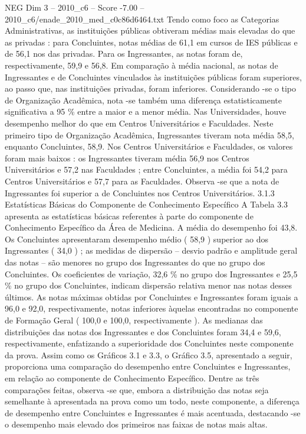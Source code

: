 \begin{textsample}{NEG Dim 3 – 2010\_c6 – Score -7.00 – 2010\_c6/enade\_2010\_med\_c0c86d6464.txt}
Tendo como foco as Categorias Administrativas, as instituições públicas obtiveram médias mais elevadas do que as privadas : para Concluintes, notas médias de 61,1 em cursos de IES públicas e de 56,1 nos das privadas.
Para os Ingressantes, as notas foram de, respectivamente, 59,9 e 56,8.
Em comparação à média nacional, as notas de Ingressantes e de Concluintes vinculados às instituições públicas foram superiores, ao passo que, nas instituições privadas, foram inferiores.
Considerando -se o tipo de Organização Acadêmica, nota -se também uma diferença estatisticamente significativa a 95 \% entre a maior e a menor média.
Nas Universidades, houve desempenho melhor do que em Centros Universitários e Faculdades.
Neste primeiro tipo de Organização Acadêmica, Ingressantes tiveram nota média 58,5, enquanto Concluintes, 58,9.
Nos Centros Universitários e Faculdades, os valores foram mais baixos : os Ingressantes tiveram média 56,9 nos Centros Universitários e 57,2 nas Faculdades ; entre Concluintes, a média foi 54,2 para Centros Universitários e 57,7 para as Faculdades.
Observa -se que a nota de Ingressantes foi superior a de Concluintes nos Centros Universitários. 3.1.3 Estatísticas Básicas do Componente de Conhecimento Específico A Tabela 3.3 apresenta as estatísticas básicas referentes à parte do componente de Conhecimento Específico da Área de Medicina.
A média do desempenho foi 43,8.
Os Concluintes apresentaram desempenho médio ( 58,9 ) superior ao dos Ingressantes ( 34,0 ) ; as medidas de dispersão – desvio padrão e amplitude geral das notas – são menores no grupo dos Ingressantes do que no grupo dos Concluintes.
Os coeficientes de variação, 32,6 \% no grupo dos Ingressantes e 25,5 \% no grupo dos Concluintes, indicam dispersão relativa menor nas notas desses últimos.
As notas máximas obtidas por Concluintes e Ingressantes foram iguais a 96,0 e 92,0, respectivamente, notas inferiores àquelas encontradas no componente de Formação Geral ( 100,0 e 100,0, respectivamente ).
As medianas das distribuições das notas dos Ingressantes e dos Concluintes foram 34,4 e 59,6, respectivamente, enfatizando a superioridade dos Concluintes neste componente da prova.
Assim como os Gráficos 3.1 e 3.3, o Gráfico 3.5, apresentado a seguir, proporciona uma comparação do desempenho entre Concluintes e Ingressantes, em relação ao componente de Conhecimento Específico.
Dentre as três comparações feitas, observa -se que, embora a distribuição das notas seja semelhante à apresentada na prova como um todo, neste componente, a diferença de desempenho entre Concluintes e Ingressantes é mais acentuada, destacando -se o desempenho mais elevado dos primeiros nas faixas de notas mais altas.

\end{textsample}
